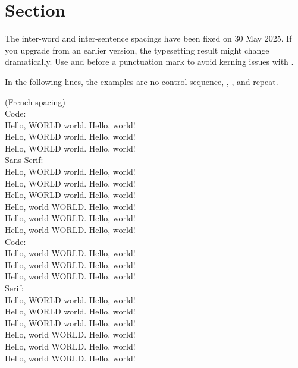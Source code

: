 \section{Section}

The inter-word and inter-sentence spacings have been fixed on 30 May 2025.
If you upgrade from an earlier version,
the typesetting result might change dramatically.
Use \texttt{\string\willstop} and \texttt{\string\wontstop}
before a punctuation mark
to avoid kerning issues with \texttt{\string\@}.

In the following lines, the examples are
no control sequence,
\texttt{\string\willstop},
\texttt{\string\wontstop},
and repeat.

\frenchspacing
(French spacing)\\
{\ttfamily
Code:\\
Hello, WORLD world. Hello, world!\\
Hello, WORLD world\willstop. Hello, world!\\
Hello, WORLD world\wontstop. Hello, world!\\
{\sffamily
Sans Serif:\\
Hello, WORLD world. Hello, world!\\
Hello, WORLD world\willstop. Hello, world!\\
Hello, WORLD world\wontstop. Hello, world!\\
Hello, world WORLD. Hello, world!\\
Hello, world WORLD\willstop. Hello, world!\\
Hello, world WORLD\wontstop. Hello, world!\\
}%
Code:\\
Hello, world WORLD. Hello, world!\\
Hello, world WORLD\willstop. Hello, world!\\
Hello, world WORLD\wontstop. Hello, world!\\
}%
Serif:\\
Hello, WORLD world. Hello, world!\\
Hello, WORLD world\willstop. Hello, world!\\
Hello, WORLD world\wontstop. Hello, world!\\
Hello, world WORLD. Hello, world!\\
Hello, world WORLD\willstop. Hello, world!\\
Hello, world WORLD\wontstop. Hello, world!

